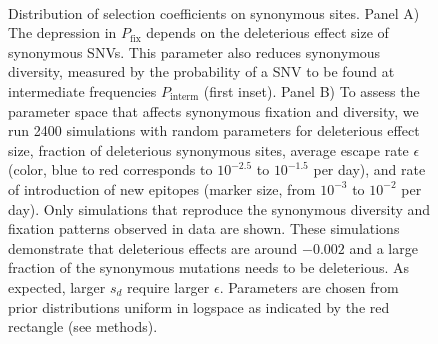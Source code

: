 \documentclass[rmp, twocolumn]{revtex4}
\newcommand{\pfix}{P_{\mathrm{fix}}}
\begin{document}
\begin{figure}
\begin{center}
\\
\caption{Distribution of selection coefficients on synonymous sites. Panel A)
The depression in $\pfix$ depends on the deleterious effect size 
of synonymous SNVs. This parameter also reduces synonymous
diversity, measured by the probability of a SNV to be found at
intermediate frequencies $P_\text{interm}$ (first inset).
Panel B) To assess the parameter space that affects synonymous fixation and
diversity, we run 2400 simulations with random parameters for deleterious effect
size, fraction of deleterious synonymous sites, average escape rate $\epsilon$
(color, blue to red corresponds to $10^{-2.5}$ to $10^{-1.5}$ per day), and rate of
introduction of new epitopes (marker size, from $10^{-3}$ to $10^{-2}$ per
day). Only simulations that reproduce the synonymous diversity and fixation
patterns observed in data are shown. These simulations demonstrate that
deleterious effects are around $-0.002$ and a large fraction of the 
synonymous mutations needs to be deleterious. As expected, larger
$s_d$ require larger $\epsilon$. Parameters are chosen
from prior distributions uniform in logspace as indicated by the red rectangle
(see methods).}
\label{fig:simheat}
\end{center}
\end{figure}
\end{document}
